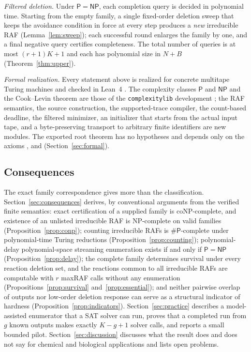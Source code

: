 \documentclass[11pt,a4paper]{article}
\theoremstyle{plain}
\theoremstyle{definition}
\theoremstyle{remark}
\newcommand{\PP}{\mathsf P}
\newcommand{\NP}{\mathsf{NP}}
\newcommand{\sharpP}{\#\mathsf P}
\begin{document}
\emph{Filtered deletion.} Under $\PP=\NP$, each completion query is decided in polynomial time. Starting from the empty family, a single fixed-order deletion sweep that keeps the avoidance condition in force at every step produces a \emph{new} irreducible RAF (Lemma~\ref{lem:sweep}); each successful round enlarges the family by one, and a final negative query certifies completeness. The total number of queries is at most $(r+1)K+1$ and each has polynomial size in $N+B$ (Theorem~\ref{thm:upper}).

\emph{Formal realization.} Every statement above is realized for concrete multitape Turing machines and checked in Lean~4 \cite{demoura2021lean4,mathlib2020}. The complexity classes $\PP$ and $\NP$ and the Cook--Levin theorem \cite{cook1971complexity,levin1973universal} are those of the \texttt{complexitylib} development \cite{schlesinger2025complexitylib}; the RAF semantics, the source construction, the supported-trace compiler, the count-based deadline, the filtered minimizer, an initializer that starts from the actual input tape, and a byte-preserving transport to arbitrary finite identifiers are new modules. The exported root theorem has no hypotheses and depends only on the axioms ,  and  (Section~\ref{sec:formal}).

\subsection{Consequences}

The exact family correspondence gives more than the classification. Section~\ref{sec:consequences} derives, by conventional arguments from the verified finite semantics: exact certification of a supplied family is coNP-complete, and existence of an unlisted irreducible RAF is NP-complete on valid families (Proposition~\ref{prop:conp}); counting irreducible RAFs is $\sharpP$-complete under polynomial-time Turing reductions (Proposition~\ref{prop:counting}); polynomial-delay polynomial-space streaming enumeration exists if and only if $\PP=\NP$ (Proposition~\ref{prop:delay}); the complete family determines survival under every reaction deletion set, and the reactions common to all irreducible RAFs are computable with $r$ maxRAF calls without any enumeration (Propositions~\ref{prop:survival} and~\ref{prop:essential}); and neither pairwise overlap of outputs nor low-order deletion response can serve as a structural indicator of hardness (Proposition~\ref{prop:indicators}). Section~\ref{sec:practice} describes a model-assisted enumerator that a SAT solver can run, proves that a completed run from $g$ known outputs makes exactly $K-g+1$ solver calls, and reports a small bounded pilot. Section~\ref{sec:discussion} discusses what the result does and does not say for chemical and biological applications and lists open problems.
\end{document}
